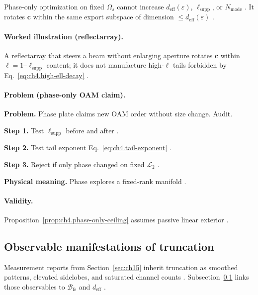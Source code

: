 \begin{proposition}
\label{prop:ch4.phase-only-ceiling}
Phase-only optimization on fixed \(\Omega_{s}\) cannot increase \(d_{\mathrm{eff}}(\varepsilon)\), \(\ell_{\mathrm{supp}}\), or
\(N_{\mathrm{mode}}\) \cite{stratton1941,jackson1999,hansen1988,harrington2001}. It rotates \(\mathbf{c}\) within the same export
subspace of dimension \(\le d_{\mathrm{eff}}(\varepsilon)\) \cite{devaney2004}.
\end{proposition}

\paragraph{Worked illustration (reflectarray).}
A reflectarray that steers a beam without enlarging aperture rotates \(\mathbf{c}\) within \(\ell=1\)--\(\ell_{\mathrm{supp}}\) content;
it does not manufacture high-\(\ell\) tails forbidden by Eq.~\eqref{eq:ch4.high-ell-decay} \cite{hansen1988,jackson1999,harrington2001}.

\paragraph{Problem (phase-only OAM claim).}
\textbf{Problem.} Phase plate claims new OAM order without size change. Audit.

\textbf{Step 1.} Test \(\ell_{\mathrm{supp}}\) before and after \cite{hansen1988,stratton1941}.

\textbf{Step 2.} Test tail exponent Eq.~\eqref{eq:ch4.tail-exponent} \cite{jackson1999,devaney2004}.

\textbf{Step 3.} Reject if only phase changed on fixed \(\mathcal{L}_{2}\) \cite{harrington2001}.

\textbf{Physical meaning.} Phase explores a fixed-rank manifold \cite{stratton1941}.

\paragraph{Validity.}
Proposition~\ref{prop:ch4.phase-only-ceiling} assumes passive linear exterior \cite{stratton1941}.


\subsection{Observable manifestations of truncation}
\label{sec:ch493}

Measurement reports from Section~\ref{sec:ch15} inherit truncation as smoothed patterns, elevated sidelobes, and saturated channel
counts \cite{stratton1941,harrington2001}. Subsection~\ref{sec:ch493} links those observables to \(\mathcal{B}_{\mathrm{fs}}\) and
\(d_{\mathrm{eff}}\) \cite{hansen1988,devaney2004}.

